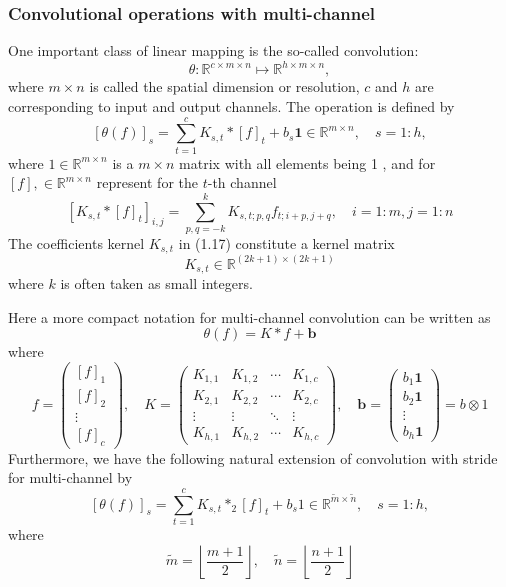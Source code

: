 \documentclass[10pt]{article}
\begin{document}
\subsubsection{Convolutional operations with multi-channel}
One important class of linear mapping is the so-called convolution:
$$
\theta: \mathbb{R}^{c \times m \times n} \mapsto \mathbb{R}^{h \times m \times n},
$$
where $m \times n$ is called the spatial dimension or resolution, $c$ and $h$ are corresponding to input and output channels. The operation is defined by
$$
[\theta(f)]_{s}=\sum_{t=1}^{c} K_{s, t} *[f]_{t}+b_{s} \mathbf{1} \in \mathbb{R}^{m \times n}, \quad s=1: h,
$$
where $1 \in \mathbb{R}^{m \times n}$ is a $m \times n$ matrix with all elements being 1 , and for $[f], \in \mathbb{R}^{m \times n}$ represent for the $t$-th channel
$$
\left[K_{s, t} *[f]_{t}\right]_{i, j}=\sum_{p, q=-k}^{k} K_{s, t ; p, q} f_{t ; i+p, j+q}, \quad i=1: m, j=1: n
$$
The coefficients kernel $K_{s, t}$ in (1.17) constitute a kernel matrix
$$
K_{s, t} \in \mathbb{R}^{(2 k+1) \times(2 k+1)}
$$
where $k$ is often taken as small integers.

Here a more compact notation for multi-channel convolution can be written as
$$
\theta(f)=K * f+\mathbf{b}
$$
where
$$
f=\left(\begin{array}{c}
{[f]_{1}} \\
{[f]_{2}} \\
\vdots \\
{[f]_{c}}
\end{array}\right), \quad K=\left(\begin{array}{cccc}
K_{1,1} & K_{1,2} & \cdots & K_{1, c} \\
K_{2,1} & K_{2,2} & \cdots & K_{2, c} \\
\vdots & \vdots & \ddots & \vdots \\
K_{h, 1} & K_{h, 2} & \cdots & K_{h, c}
\end{array}\right), \quad \mathbf{b}=\left(\begin{array}{c}
b_{1} \mathbf{1} \\
b_{2} \mathbf{1} \\
\vdots \\
b_{h} \mathbf{1}
\end{array}\right)=b \otimes 1
$$
Furthermore, we have the following natural extension of convolution with stride for multi-channel by
$$
[\theta(f)]_{s}=\sum_{t=1}^{c} K_{s, t} *_{2}[f]_{t}+b_{s} 1 \in \mathbb{R}^{\tilde{m} \times \tilde{n}}, \quad s=1: h,
$$
where
$$
\tilde{m}=\left\lfloor\frac{m+1}{2}\right\rfloor, \quad \tilde{n}=\left\lfloor\frac{n+1}{2}\right\rfloor
$$
\end{document}
